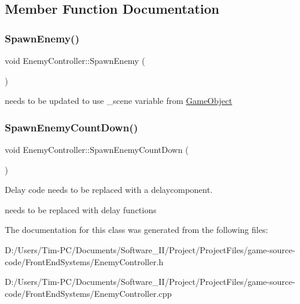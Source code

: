 \subsection{Member Function Documentation}
\mbox{\label{class_enemy_controller_ab5298e79a0bf598ed8684efb8a6a3927}} 
\subsubsection{\texorpdfstring{Spawn\+Enemy()}{SpawnEnemy()}}
{\footnotesize\ttfamily void Enemy\+Controller\+::\+Spawn\+Enemy (\begin{DoxyParamCaption}{ }\end{DoxyParamCaption})\hspace{0.3cm}{\ttfamily [private]}}

needs to be updated to use \+\_\+scene variable from \hyperlink{class_game_object}{Game\+Object} \mbox{\label{class_enemy_controller_a84eabc12a38617b5ff05c6e896e97531}} 
\subsubsection{\texorpdfstring{Spawn\+Enemy\+Count\+Down()}{SpawnEnemyCountDown()}}
{\footnotesize\ttfamily void Enemy\+Controller\+::\+Spawn\+Enemy\+Count\+Down (\begin{DoxyParamCaption}{ }\end{DoxyParamCaption})\hspace{0.3cm}{\ttfamily [private]}}



Delay code needs to be replaced with a delaycomponent. 

needs to be replaced with delay functions 

The documentation for this class was generated from the following files\+:\begin{DoxyCompactItemize}
\item 
D\+:/\+Users/\+Tim-\/\+P\+C/\+Documents/\+Software\+\_\+\+I\+I/\+Project/\+Project\+Files/game-\/source-\/code/\+Front\+End\+Systems/Enemy\+Controller.\+h\item 
D\+:/\+Users/\+Tim-\/\+P\+C/\+Documents/\+Software\+\_\+\+I\+I/\+Project/\+Project\+Files/game-\/source-\/code/\+Front\+End\+Systems/Enemy\+Controller.\+cpp\end{DoxyCompactItemize}
